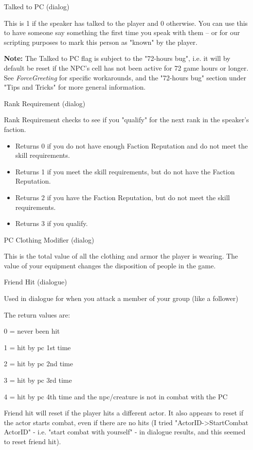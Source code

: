 Talked to PC (dialog)

This is 1 if the speaker has talked to the player and 0 otherwise. You
can use this to have someone say something the first time you speak with
them -- or for our scripting purposes to mark this person as "known" by
the player.

\textbf{Note:} The Talked to PC flag is subject to the "72-hours bug",
i.e. it will by default be reset if the NPC's cell has not been active
for 72 game hours or longer. See \emph{ForceGreeting} for specific
workarounds, and the "72-hours bug" section under "Tips and Tricks" for
more general information.

Rank Requirement (dialog)

Rank Requirement checks to see if you "qualify" for the next rank in the
speaker's faction.

\begin{itemize}
\item
  Returns 0 if you do not have enough Faction Reputation and do not meet
  the skill requirements.
\item
  Returns 1 if you meet the skill requirements, but do not have the
  Faction Reputation.
\item
  Returns 2 if you have the Faction Reputation, but do not meet the
  skill requirements.
\item
  Returns 3 if you qualify.
\end{itemize}

PC Clothing Modifier (dialog)

This is the total value of all the clothing and armor the player is
wearing. The value of your equipment changes the disposition of people
in the game.

Friend Hit (dialogue)

Used in dialogue for when you attack a member of your group (like a
follower)

The return values are:

0 = never been hit

1 = hit by pc 1st time

2 = hit by pc 2nd time

3 = hit by pc 3rd time

4 = hit by pc 4th time and the npc/creature is not in combat with the PC

Friend hit will reset if the player hits a different actor. It also
appears to reset if the actor starts combat, even if there are no hits
(I tried "ActorID-\textgreater StartCombat ActorID" - i.e. "start combat
with yourself" - in dialogue results, and this seemed to reset friend
hit).

